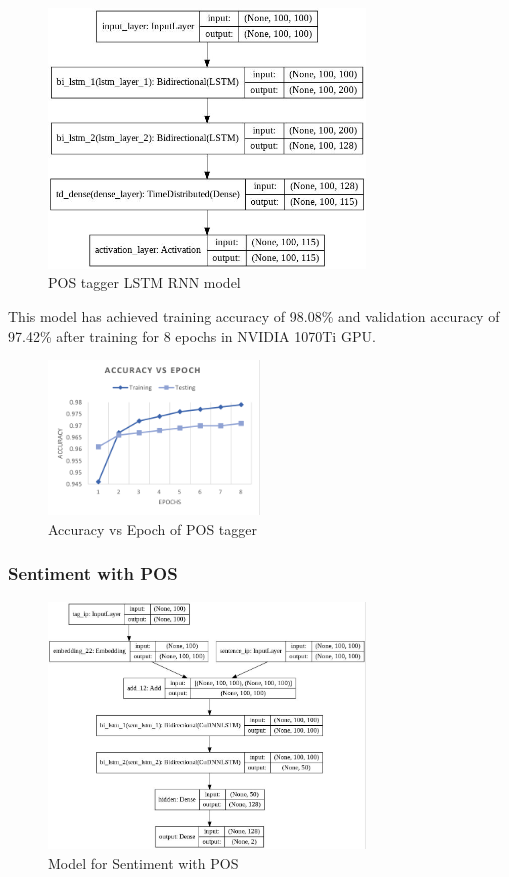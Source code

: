         \begin{figure}[hbt!]
            \centering
                \includegraphics[width=0.75\textwidth]{./img/6.18.jpg}
                \caption{POS tagger LSTM RNN model}
        \end{figure}
This model has achieved training accuracy of 98.08\% and validation accuracy of
97.42\% after training for 8 epochs in NVIDIA 1070Ti GPU.

        \begin{figure}[hbt!]
            \centering
                \includegraphics[width=0.5\textwidth]{./img/6.19.png}
                \caption{Accuracy vs Epoch of POS tagger}
        \end{figure}

                \subsubsection{Sentiment with POS}
        
        
        \begin{figure}[hbt!]
            \centering
                \includegraphics[width=0.75\textwidth]{./img/6.20.jpg}
                \caption{Model for Sentiment with POS}
        \end{figure}


